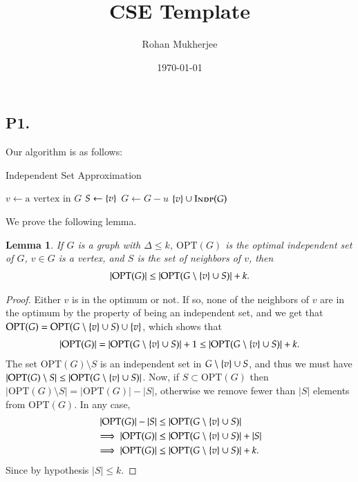 \documentclass[12pt]{article}
\title{CSE Template}
\date{\today}
\author{Rohan Mukherjee}
\newtheorem{lemma}{Lemma}
\theoremstyle{definitionstyle}
\newcommand{\SET}[1]{\Set{\mskip-\medmuskip #1 \mskip-\medmuskip}}
\newcommand{\OPT}{\mathrm{OPT}}
\begin{document}
    \maketitle
    \subsection*{P1.}
    Our algorithm is as follows:
    \begin{algorithm}
        \caption{Independent Set Approximation}
        \begin{algorithmic} %
            \State $v \gets \text{a vertex in } G$
            \State $S \gets \SET{v}$
                \State $G \gets G - u$
            \EndFor
            \State \Return $\SET{v} \cup \Call{Indp}{G}$
            \EndProcedure
        \end{algorithmic}
    \end{algorithm}
    We prove the following lemma.
    \begin{lemma}
        If $G$ is a graph with $\Delta \leq k$, $\OPT(G)$ is the optimal independent set of $G$, $v \in G$ is a vertex, and $S$ is the set of neighbors of $v$, then 
        \begin{align*}
            |\OPT(G)| \leq |\OPT(G \setminus \SET{v} \cup S)| + k.
        \end{align*}
    \end{lemma}
    \begin{proof}
        Either $v$ is in the optimum or not. If so, none of the neighbors of $v$ are in the optimum by the property of being an independent set, and we get that $\OPT(G) = \OPT(G \setminus \SET{v} \cup S) \cup \SET{v}$, which shows that 
        \begin{align*}
            |\OPT(G)| = |\OPT(G \setminus \SET{v} \cup S)| + 1 \leq |\OPT(G \setminus \SET{v} \cup S)| + k.
        \end{align*}
        The set $\OPT(G) \setminus S$ is an independent set in $G \setminus \SET{v} \cup S$, and thus we must have $|\OPT(G) \setminus S| \leq |\OPT(G \setminus \SET{v} \cup S)|$.  Now, if $S \subset \OPT(G)$ then $|\OPT(G) \setminus S| = |\OPT(G)| - |S|$, otherwise we remove fewer than $|S|$ elements from $\OPT(G)$. In any case,
        \begin{align*}
            |\OPT(G)| - |S| &\leq |\OPT(G \setminus \SET{v} \cup S)| 
            \\\implies |\OPT(G)| &\leq |\OPT(G \setminus \SET{v} \cup S)| + |S| \\
            \implies |\OPT(G)| &\leq |\OPT(G \setminus \SET{v} \cup S)| + k.
        \end{align*}
        Since by hypothesis $|S| \leq k$.
    \end{proof}
\end{document}
